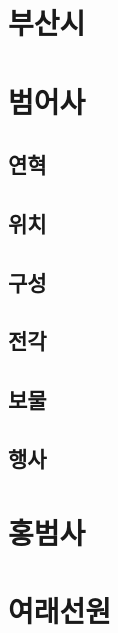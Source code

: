\documentclass[12pt, a4paper, oneside]{book}
\let\stdsection\section
\renewcommand\section{\newpage\stdsection}
\begin{document}
	\chapter{부산시}


	\chapter{범어사}
	\minitoc


		\section{연혁}

		\section{위치}

		\section{구성}

		\section{전각}

		\section{보물}

		\section{행사}

	\chapter{홍범사}




	\chapter{여래선원}
\end{document}
